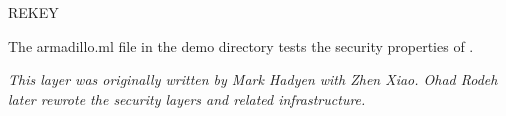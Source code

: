 \begin{Layer}{REKEY}
\begin{Sources}
\end{Sources}

\begin{GenEvent}
\end{GenEvent}

\begin{Testing}
\item 
The armadillo.ml file in the demo directory tests the security properties
of \ensemble.
\end{Testing}

\emph{This layer was originally written by Mark Hadyen with Zhen Xiao.
Ohad Rodeh later rewrote the security layers and related infrastructure.}
\end{Layer}


